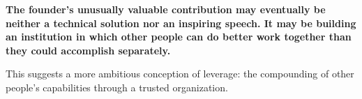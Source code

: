 \textbf{The founder's unusually valuable contribution may eventually be neither a technical solution nor an inspiring speech. It may be building an institution in which other people can do better work together than they could accomplish separately.}

This suggests a more ambitious conception of leverage: the compounding of other people's capabilities through a trusted organization.
